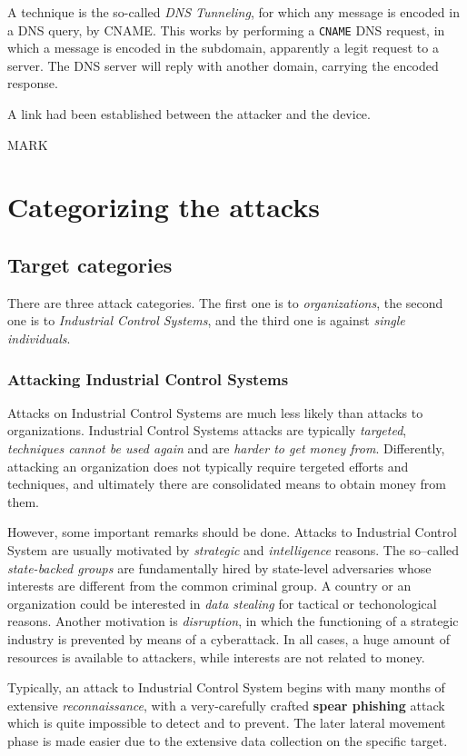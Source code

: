 \documentclass[10pt]{extbook}
\begin{document}
A technique is the so\--called \emph{DNS Tunneling}, for which any message is
encoded in a DNS query, by CNAME. This works by performing a \texttt{CNAME} DNS
request, in which a message is encoded in the subdomain, apparently a legit
request to a server. The DNS server will reply with another domain, carrying
the encoded response.

A link had been established between the
attacker and the device.

MARK
\chapter{Categorizing the attacks}

\section{Target categories}

There are three attack categories. The first one is to \emph{organizations},
the second one is to \emph{Industrial Control Systems}, and the third one
is against \emph{single individuals}.

\subsection{Attacking Industrial Control Systems}

Attacks on Industrial Control Systems are much less likely than attacks to
organizations. Industrial Control Systems attacks are typically
\emph{targeted}, \emph{techniques cannot be used again} and are \emph{harder to
get money from}. Differently, attacking an organization does not typically
require tergeted efforts and techniques, and ultimately there are consolidated
means to obtain money from them.

However, some important remarks should be done. Attacks to Industrial Control
System are usually motivated by \emph{strategic} and \emph{intelligence}
reasons. The so--called \emph{state\--backed groups} are fundamentally hired
by state\--level adversaries whose interests are different from the common
criminal group. A country or an organization could be interested in \emph{data
stealing} for tactical or techonological reasons. Another motivation is
\emph{disruption}, in which the functioning of a strategic industry is
prevented by means of a cyberattack. In all cases, a huge amount of resources
is available to attackers, while interests are not related to money.

Typically, an attack to Industrial Control System begins with many months of
extensive \emph{reconnaissance}, with a very\--carefully crafted \textbf{spear
phishing} attack which is quite impossible to detect and to prevent. The later
lateral movement phase is made easier due to the extensive data collection on
the specific target.
\end{document}
